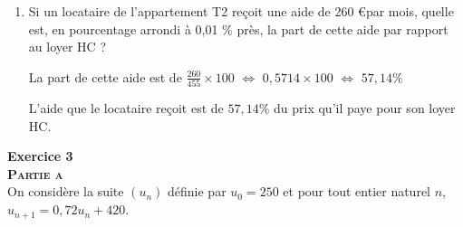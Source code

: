 \documentclass[12pt,a4paper]{article}
\theoremstyle{break}
\begin{document}
\begin{enumerate}
\begin{enumerate}
		\end{enumerate}
		\item Si un locataire de l’appartement T2 reçoit une aide de 260 \euro par mois, quelle est, en pourcentage arrondi à 0,01 \% près, la part de cette aide par rapport au loyer HC ?\par
		La part de cette aide est de $\frac{260}{455} \times 100 $ $\Leftrightarrow$ $ 0,5714 \times 100 $ $\Leftrightarrow$ $ 57,14\%$\par
		L'aide que le locataire reçoit est de $57,14\%$ du prix qu'il paye pour son loyer HC.
		
	\end{enumerate}
\newpage
\textbf{Exercice 3}\\
		\textsf{\small{\textsc{\textbf{Partie a}}}}\\
		On considère la suite $\left(u_{n}\right)$ définie par $u_{0} = 250$ et pour tout entier naturel $n$, $ u_{n+1} = 0,72u_{n} +420$.
	
\end{document}
